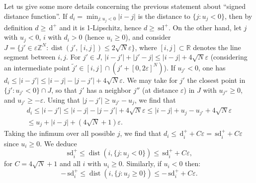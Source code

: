 \documentclass[10pt]{amsart}
\theoremstyle{plain}
\theoremstyle{definition}
\newcommand{\R}{\mathbb{R}}
\newcommand{\Z}{\mathbb{Z}}
\DeclareMathOperator{\dist}{dist}
\newcommand{\e}{\varepsilon}
\newcommand{\ud}{\,\mathrm{d}}
\newcommand{\sd}{\,\mathrm{sd}}
\newcommand{\ez}{\e\Z^N}
\numberwithin{equation}{section}
\begin{document}
Let us give some more details concerning the previous statement about ``signed distance function''. If $d_i = \min_{j:u_j<0} |i-j|$ is the distance to $\{j:u_j<0\}$,
then by definition $d \ge \ud^+$ and it is  {1}-Lipschitz, hence $d \ge \sd^+$.
On the other hand, let $j$ with $u_j<0$, $i$ with $d_i>0$ (hence $u_i\ge 0$),
and consider $J=\{j'\in \ez: \dist(j',[i,j])\le 2\sqrt{N}\e\}$,  {where $[i,j]\subset \R$ denotes the line segment between $i,j$}.
For $j'\in J$, $|i-j'| + |j'-j|\le |i-j|+4\sqrt{N}\e$ (considering  {an intermediate point $\tilde j'\in [i,j]\cap (j'+[0,2\e]^N)$}).  
If $u_{j'}<0$, one has $d_i \le |i-j'| \le |i-j|-|j-j'|+4\sqrt{N}\e$. We may take
for $j'$ the closest point in $\{j':u_{j'}<0\}\cap J$, so that $j'$ has a neighbor $j''$
(at distance $\e$) in $J$ with $u_{j''}\ge 0$, and $u_{j'}\ge -\e$.
Using that $|j-j'|\ge u_{j'}-u_{j}$, we find that
\begin{multline*}
  d_i \le |i-j'| \le |i-j|-|j-j'|+4\sqrt{N}\e
  \le  |i-j| + u_j - u_{j'}+4\sqrt{N}\e
  \\ \le u_j+|i-j| + (4\sqrt{N}+1)\e.
\end{multline*}
Taking the infimum over all possible $j$, we find that $d_i\le \ud^+_i+C\e = \sd^+_i+C\e$
since $u_i\ge 0$. We deduce
\begin{equation}\label{eq:compdist}
  \sd^+_i \le \dist(i,\{j:u_j<0\}) \le \sd^+_i+C\e,
\end{equation}
for $C=4\sqrt{N}+1$ and all $i$ with $u_i\ge 0$. Similarly, if $u_i<0$ then:
\begin{equation}\label{eq:compdistm}
  -\sd^+_i  \le \dist(i,\{j:u_j\ge 0\}) \le -\sd^+_i+C\e.
\end{equation}
\end{document}
